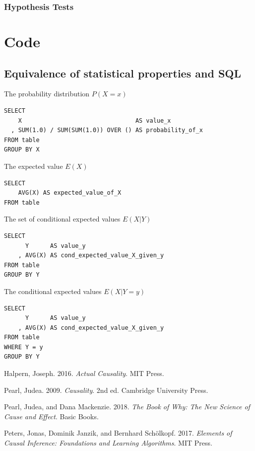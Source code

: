 \documentclass[
]{book}
\theoremstyle{definition}
\theoremstyle{definition}
\theoremstyle{definition}
\theoremstyle{remark}
\begin{document}
\hypertarget{hypothesis-tests}{%
\subsection{Hypothesis Tests}\label{hypothesis-tests}}

\hypertarget{code}{%
\chapter{Code}\label{code}}

\hypertarget{equivalence-of-statistical-properties-and-sql}{%
\section{Equivalence of statistical properties and SQL}\label{equivalence-of-statistical-properties-and-sql}}

The probability distribution \(P(X = x)\)

\begin{verbatim}
SELECT
    X                                AS value_x
  , SUM(1.0) / SUM(SUM(1.0)) OVER () AS probability_of_x
FROM table
GROUP BY X
\end{verbatim}

The expected value \(E(X)\)

\begin{verbatim}
SELECT
    AVG(X) AS expected_value_of_X
FROM table
\end{verbatim}

The set of conditional expected values \(E(X|Y)\)

\begin{verbatim}
SELECT
      Y      AS value_y
    , AVG(X) AS cond_expected_value_X_given_y
FROM table
GROUP BY Y
\end{verbatim}

The conditional expected values \(E(X|Y = y)\)

\begin{verbatim}
SELECT
      Y      AS value_y
    , AVG(X) AS cond_expected_value_X_given_y
FROM table
WHERE Y = y
GROUP BY Y
\end{verbatim}

\hypertarget{refs}{}
\leavevmode\hypertarget{ref-halpern2016}{}%
Halpern, Joseph. 2016. \emph{Actual Causality}. MIT Press.

\leavevmode\hypertarget{ref-pearl2009}{}%
Pearl, Judea. 2009. \emph{Causality}. 2nd ed. Cambridge University Press.

\leavevmode\hypertarget{ref-pearl2019}{}%
Pearl, Judea, and Dana Mackenzie. 2018. \emph{The Book of Why: The New Science of Cause and Effect}. Basic Books.

\leavevmode\hypertarget{ref-peters2017}{}%
Peters, Jonas, Dominik Janzik, and Bernhard Schölkopf. 2017. \emph{Elements of Causal Inference: Foundations and Learning Algorithms}. MIT Press.
\end{document}
